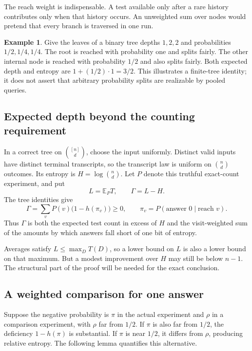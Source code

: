 \documentclass[11pt]{article}
\theoremstyle{definition}
\newtheorem{example}[theorem]{Example}
\theoremstyle{remark}
\newcommand{\E}{\mathbb E}
\numberwithin{equation}{section}
\begin{document}
The reach weight is indispensable. A test available only after a rare
history contributes only when that history occurs. An unweighted sum
over nodes would pretend that every branch is traversed in one run.

\begin{example}
Give the leaves of a binary tree depths \(1,2,2\) and probabilities
\(1/2,1/4,1/4\). The root is reached with probability one and splits
fairly. The other internal node is reached with probability \(1/2\)
and also splits fairly. Both expected depth and entropy are
\(1+(1/2)\cdot1=3/2\).
This illustrates a finite-tree identity; it does not assert that
arbitrary probability splits are realizable by pooled queries.
\end{example}

\subsection{Expected depth beyond the counting requirement}

In a correct tree on \(\binom{[n]}d\), choose the input uniformly.
Distinct valid inputs have distinct terminal transcripts, so the
transcript law is uniform on \(\binom nd\) outcomes. Its entropy is
\(H=\log\binom nd\).
Let \(P\) denote this truthful exact-count experiment, and put
\[
 L=\E_P T,\qquad \Gamma=L-H.
\]
The tree identities give
\begin{equation}\label{eq:Gamma}
 \Gamma=\sum_v P(v)\bigl(1-h(\pi_v)\bigr)\ge0,
 \qquad \pi_v=P(\text{answer }0\mid\text{reach }v).
\end{equation}
Thus \(\Gamma\) is both the expected test count in excess of \(H\)
and the visit-weighted sum of the amounts by which answers fall
short of one bit of entropy.

Averages satisfy \(L\le\max_D T(D)\), so a lower bound on \(L\)
is also a lower bound on that maximum. But a modest improvement over
\(H\) may still be below \(n-1\). The structural part of the proof
will be needed for the exact conclusion.

\subsection{A weighted comparison for one answer}

Suppose the negative probability is \(\pi\) in the actual experiment
and \(\rho\) in a comparison experiment, with \(\rho\) far from \(1/2\).
If \(\pi\) is also far from \(1/2\), the deficiency \(1-h(\pi)\)
is substantial. If \(\pi\) is near \(1/2\), it differs from \(\rho\),
producing relative entropy. The following lemma quantifies this
alternative.
\end{document}
